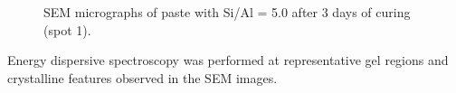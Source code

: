 \begin{figure}[H]
  \centering
  \caption{SEM micrographs of paste with Si/Al = 5.0 after 3 days of curing (spot 1).}
  \label{fig:si_al_5-0_spot1_sem}
\end{figure}


Energy dispersive spectroscopy was performed at representative gel regions and crystalline features observed in the SEM images.

